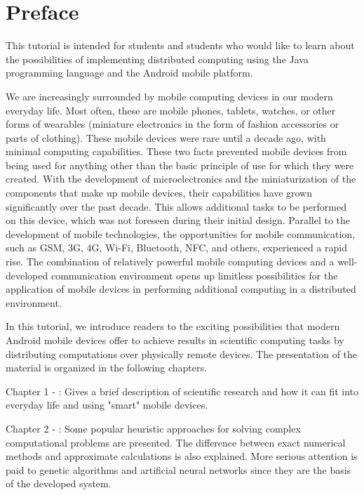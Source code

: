 \newpage
{}
\chapter*{Preface}

This tutorial is intended for students and students who would like to learn about the possibilities of implementing distributed computing using the Java programming language and the Android mobile platform.

We are increasingly surrounded by mobile computing devices in our modern everyday life. Most often, these are mobile phones, tablets, watches, or other forms of wearables (miniature electronics in the form of fashion accessories or parts of clothing). These mobile devices were rare until a decade ago, with minimal computing capabilities. These two facts prevented mobile devices from being used for anything other than the basic principle of use for which they were created. With the development of microelectronics and the miniaturization of the components that make up mobile devices, their capabilities have grown significantly over the past decade. This allows additional tasks to be performed on this device, which was not foreseen during their initial design. Parallel to the development of mobile technologies, the opportunities for mobile communication, such as GSM, 3G, 4G, Wi-Fi, Bluetooth, NFC, and others, experienced a rapid rise. The combination of relatively powerful mobile computing devices and a well-developed communication environment opens up limitless possibilities for the application of mobile devices in performing additional computing in a distributed environment.

In this tutorial, we introduce readers to the exciting possibilities that modern Android mobile devices offer to achieve results in scientific computing tasks by distributing computations over physically remote devices. The presentation of the material is organized in the following chapters.

Chapter 1 - : Gives a brief description of scientific research and how it can fit into everyday life and using "smart" mobile devices.

Chapter 2 - : Some popular heuristic approaches for solving complex computational problems are presented. The difference between exact numerical methods and approximate calculations is also explained. More serious attention is paid to genetic algorithms and artificial neural networks since they are the basis of the developed system.


